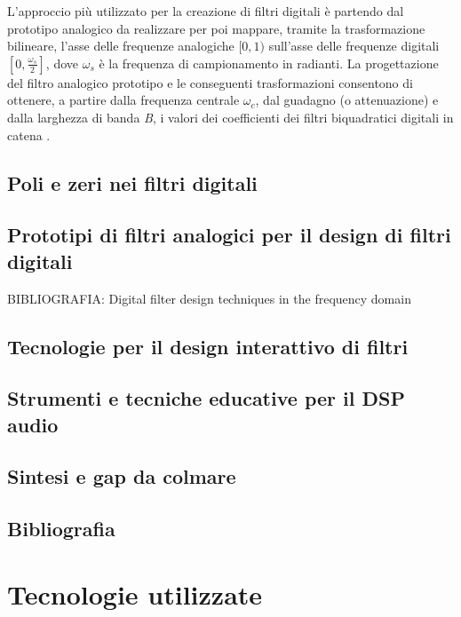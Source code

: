 \documentclass[12pt]{report}
\begin{document}
L'approccio più utilizzato per la creazione di filtri digitali è partendo dal prototipo analogico da realizzare per poi mappare, tramite la trasformazione bilineare, l'asse delle frequenze analogiche \([0,1)\) sull'asse delle frequenze digitali \([0,\frac{\omega_s}{2}]\), dove \(\omega_s\) è la frequenza di campionamento in radianti.
La progettazione del filtro analogico prototipo e le conseguenti trasformazioni consentono di ottenere, a partire dalla frequenza centrale \(\omega_c\), dal guadagno (o attenuazione) e dalla larghezza di banda \textit{B}, i valori dei coefficienti dei filtri biquadratici digitali in catena \parencite{reiss2010design}.



\section{Poli e zeri nei filtri digitali}

\section{Prototipi di filtri analogici per il design di filtri digitali}
BIBLIOGRAFIA: Digital filter design techniques in the frequency domain

\section{Tecnologie per il design interattivo di filtri}

\section{Strumenti e tecniche educative per il DSP audio}

\section{Sintesi e gap da colmare}

\section{Bibliografia}
\printbibliography


%
%

\chapter{Tecnologie utilizzate}
\label{cap3}
\end{document}
